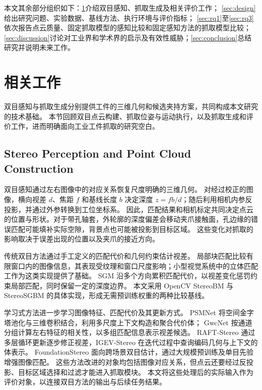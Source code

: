 \documentclass[UTF8,fontset=fandol,a4paper,11pt]{ctexart}
\newcommand{\qyb}[1]{#1}
\begin{document}
本文其余部分组织如下：\cref{sec:background}介绍双目感知、抓取生成及相关评价工作；
\cref{sec:design}给出研究问题、实验数据、基线方法、执行环境与评价指标；
\cref{sec:rq1}至\cref{sec:rq3}依次报告点云质量、固定抓取模型的感知比较和固定感知方法的抓取模型比较；
\cref{sec:discussion}讨论对工业界和学术界的启示及有效性威胁；\cref{sec:conclusion}总结研究并说明未来工作。

\section{\qyb{相关工作}}
\label{sec:background}

双目感知与抓取生成分别提供工件的三维几何和候选夹持方案，共同构成本文研究的技术基础。
本节回顾双目点云构建、抓取位姿与运动执行，以及抓取生成和评价工作，进而明确面向工业工件抓取的研究空白。

\subsection{\qyb{Stereo Perception and Point Cloud Construction}}

双目感知通过左右图像中的对应关系恢复尺度明确的三维几何。
对经过校正的图像，横向视差 $d$、焦距 $f$ 和基线长度 $b$ 决定深度 $z=fb/d$；随后利用相机内参反投影，并通过外参转换到工位坐标系。
因此，匹配结果和相机标定共同决定点云的位置与形状。对于带孔轴套，外轮廓的深度偏差会移动夹爪接触面，孔边缘的错误匹配可能填补实际空隙，背景点也可能被投影到目标区域。
这些变化对抓取的影响取决于误差出现的位置以及夹爪的接近方向。

传统双目方法通过手工定义的匹配代价和几何约束估计视差。
局部块匹配比较有限窗口内的图像信息，其表现受纹理和窗口尺度影响；小型视觉系统中的立体匹配工作为这类实现提供了基础\cite{konolige1998}。
SGM 沿多个方向累积匹配代价，以视差变化惩罚约束局部匹配，同时保留一定的深度边界\cite{hirschmuller2008}。
本文采用 OpenCV StereoBM 与 StereoSGBM 的具体实现，形成无需预训练权重的两种比较基线。

学习式方法进一步学习图像特征、匹配代价及其更新方式。
PSMNet 将空间金字塔池化与三维卷积结合，利用多尺度上下文构造和聚合代价体\cite{chang2018}；
GwcNet 按通道分组计算左右特征的相关性，以多组匹配信息表示视差候选\cite{guo2019}。
RAFT-Stereo 通过多层循环更新逐步修正视差\cite{lipson2021}，IGEV-Stereo 在迭代过程中查询编码几何与上下文的体表示\cite{xu2023}。
FoundationStereo 面向跨场景双目估计，通过大规模预训练及单目先验增强图像匹配\cite{wen2025}。
这些方法改进的对象均包括图像对应关系，但点云还要经过反投影、目标区域选择和过滤才能进入抓取模块。
本文将这些处理后的实际输入作为评价对象，以连接双目方法的输出与后续任务结果。
\end{document}
